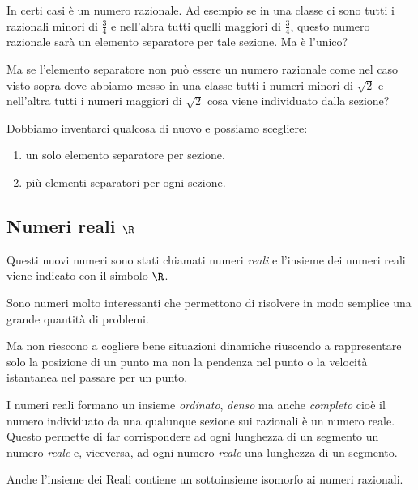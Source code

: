 In certi casi è un numero razionale. Ad esempio se in una classe ci sono 
tutti i razionali minori di \(\frac{3}{4}\) e nell'altra tutti quelli 
maggiori di \(\frac{3}{4}\), questo numero razionale sarà un elemento 
separatore per tale sezione. Ma è l'unico?

Ma se l'elemento separatore non può essere un numero razionale come nel caso 
visto sopra dove abbiamo messo in una classe tutti i numeri minori di 
\(\sqrt{2}\) e nell'altra tutti i numeri maggiori di \(\sqrt{2}\) cosa viene 
individuato dalla sezione?

Dobbiamo inventarci qualcosa di nuovo e possiamo scegliere:
\begin{enumerate}
\item un solo elemento separatore per sezione.
\item più elementi separatori per ogni sezione.
\end{enumerate}

\subsection{Numeri reali \(\R\)}


Questi nuovi numeri sono stati chiamati numeri \emph{reali} e l'insieme dei 
numeri reali viene indicato con il simbolo \(\R\).

Sono numeri molto interessanti che permettono di risolvere in modo semplice 
una grande quantità di problemi.

Ma non riescono a cogliere bene situazioni dinamiche riuscendo a 
rappresentare solo la posizione di un punto ma non la pendenza nel punto o la 
velocità istantanea nel passare per un punto.

I numeri reali formano un insieme \emph{ordinato}, \emph{denso} ma anche 
\emph{completo} cioè il numero individuato da una qualunque sezione sui 
razionali è un numero reale.
Questo permette di far corrispondere ad ogni lunghezza di un segmento 
un numero \emph{reale} e, viceversa, ad ogni numero \emph{reale} una 
lunghezza di un segmento. 

Anche l'insieme dei Reali contiene un sottoinsieme isomorfo ai numeri 
razionali.

